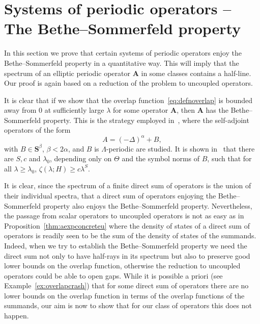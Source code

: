 \documentclass[10pt]{amsart}
\theoremstyle{definition}\newtheorem{defi}[theo]{Definition}\newtheorem{rema}[theo]{Remark}\newtheorem{exam}[theo]{Example}\newtheorem{nota}[theo]{Notation}
\newcommand{\BA}{\mathbf A}
\newcommand{\BS}{\mathbf S}
\begin{document}
\section{Systems of periodic operators -- The Bethe--Sommerfeld property}\label{sec:bs}


In this section we prove that certain systems of periodic operators enjoy the Bethe--Sommerfeld property in a quantitative way. This will imply that the spectrum of an elliptic periodic operator $\BA$ in some classes contains a half-line. Our proof is again based on a reduction of the problem to uncoupled operators.

It is clear that if we show that the overlap function~\eqref{eq:defnoverlap} is bounded away from $0$ at sufficiently large $\lambda$ for some operator $\BA$, then $\BA$ has the Bethe--Sommerfeld property. This is the strategy employed in~\cite{ParSob2010}, where the self-adjoint operators of the form
\begin{equation}
A = (-\Delta)^\alpha + B,
\end{equation}
with $B\in \BS^\beta$, $\beta < 2\alpha$, and $B$ is $\Lambda$-periodic are studied. It is shown in~\cite{ParSob2010} that there are $S, c$ and $\lambda_0$, depending only on $\Theta$ and the symbol norms of $B$, such that for all $\lambda \ge \lambda_0$, $\zeta(\lambda;H) \ge c
\lambda^S$.

It is clear, since the spectrum of a finite direct sum of operators is the union of their individual spectra, that a direct sum of operators enjoying the Bethe--Sommerfeld property also enjoys the Bethe--Sommerfeld property. Nevertheless, the passage from scalar operators to uncoupled operators is not as easy as in Proposition~\ref{thm:aexpconcreteu} where the density of states of a direct sum of operators is readily seen to be the sum of the density of states of the summands. Indeed, when we try to establish the Bethe--Sommerfeld property we need the direct sum not only to have half-rays in its spectrum but also to preserve good lower bounds on the overlap function, otherwise the reduction to uncoupled operators could be able to open gaps. While it is possible a priori (see Example~\ref{ex:overlapcrash}) that for some direct sum of operators there are no lower bounds on the overlap function in terms of the overlap functions of the summands, our aim is now to show that for our class of operators this does not happen.
\end{document}
